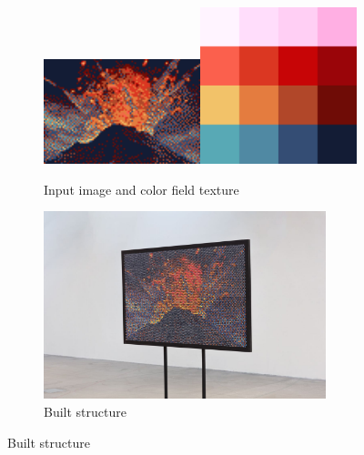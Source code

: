 \documentclass{article}
\begin{document}
\begin{figure}[ht!]
\centering
  \begin{subfigure}[t]{0.45\textwidth}
    \centering
    \includegraphics[width=0.5\textwidth]{images/volcano/input_0.png}\includegraphics[width=0.5\textwidth]{images/volcano/texture.png}
    \caption{Input image and color field texture}
  \end{subfigure}
  \begin{subfigure}[t]{0.45\textwidth}
    \centering
    \includegraphics[width=0.9\textwidth]{images/results/brontide.jpg}
    \caption{Built structure}
  \end{subfigure}
\end{figure}
\end{document}
